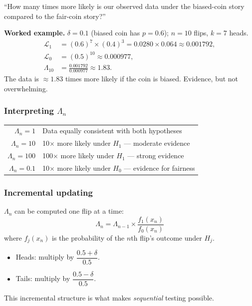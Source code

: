 \documentclass[12pt, a4paper]{article}
\newcommand{\LR}{\Lambda}              %
\begin{document}
\begin{plainlanguage}
``How many times more likely is our observed data under the biased-coin story
compared to the fair-coin story?''
\end{plainlanguage}

\textbf{Worked example.}
$\delta = 0.1$ (biased coin has $p=0.6$); $n=10$ flips, $k=7$ heads.
\begin{align*}
  \mathcal{L}_1 &= (0.6)^7 \times (0.4)^3 = 0.0280 \times 0.064 \approx 0.001792, \\
  \mathcal{L}_0 &= (0.5)^{10} \approx 0.000977, \\
  \LR_{10} &= \frac{0.001792}{0.000977} \approx 1.83.
\end{align*}
The data is $\approx\!1.83$ times more likely if the coin is biased.
Evidence, but not overwhelming.

\subsubsection*{Interpreting $\LR_n$}

\begin{center}
\begin{tabular}{@{} r l @{}}
\toprule
$\LR_n = 1$   & Data equally consistent with both hypotheses \\
$\LR_n = 10$  & 10$\times$ more likely under $H_1$ --- moderate evidence \\
$\LR_n = 100$ & 100$\times$ more likely under $H_1$ --- strong evidence \\
$\LR_n = 0.1$ & 10$\times$ more likely under $H_0$ --- evidence for fairness \\
\bottomrule
\end{tabular}
\end{center}

\subsubsection*{Incremental updating}

$\LR_n$ can be computed one flip at a time:
\[
  \boxed{\LR_n = \LR_{n-1} \times \frac{f_1(x_n)}{f_0(x_n)}}
\]
where $f_j(x_n)$ is the probability of the $n$th flip's outcome under $H_j$.
\begin{itemize}[nosep]
  \item Heads: multiply by $\dfrac{0.5+\delta}{0.5}$.
  \item Tails: multiply by $\dfrac{0.5-\delta}{0.5}$.
\end{itemize}
This incremental structure is what makes \emph{sequential} testing possible.
\end{document}
